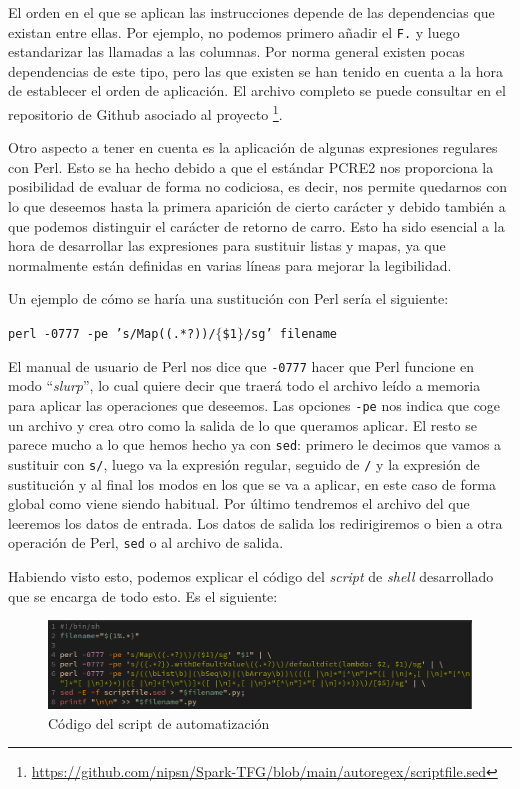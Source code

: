 \documentclass[12pt,twoside,titlepage]{report}
\newcommand{\quotes}[1]{``#1''}
\begin{document}
El orden en el que se aplican las instrucciones depende de las dependencias que existan entre ellas. Por ejemplo, no podemos primero añadir el \texttt{F.} y luego estandarizar las llamadas a las columnas. Por norma general existen pocas dependencias de este tipo, pero las que existen se han tenido en cuenta a la hora de establecer el orden de aplicación. El archivo completo se puede consultar en el repositorio de Github asociado al proyecto \footnote{\url{https://github.com/nipsn/Spark-TFG/blob/main/autoregex/scriptfile.sed}}.

Otro aspecto a tener en cuenta es la aplicación de algunas expresiones regulares con Perl. Esto se ha hecho debido a que el estándar PCRE2 nos proporciona la posibilidad de evaluar de forma no codiciosa, es decir, nos permite quedarnos con lo que deseemos hasta la primera aparición de cierto carácter y debido también a que podemos distinguir el carácter de retorno de carro. Esto ha sido esencial a la hora de desarrollar las expresiones para sustituir listas y mapas, ya que normalmente están definidas en varias líneas para mejorar la legibilidad.

Un ejemplo de cómo se haría una sustitución con Perl sería el siguiente:

\texttt{perl -0777 -pe 's/Map((.*?))/$\lbrace$\$1$\rbrace$/sg' filename}

El manual de usuario de Perl nos dice que \texttt{-0777} hacer que Perl funcione en modo \quotes{\textit{slurp}}, lo cual quiere decir que traerá todo el archivo leído a memoria para aplicar las operaciones que deseemos. Las opciones \texttt{-pe} nos indica que coge un archivo y crea otro como la salida de lo que queramos aplicar. El resto se parece mucho a lo que hemos hecho ya con \texttt{sed}: primero le decimos que vamos a sustituir con \texttt{s/}, luego va la expresión regular, seguido de \texttt{/} y la expresión de sustitución y al final los modos en los que se va a aplicar, en este caso de forma global como viene siendo habitual. Por último tendremos el archivo del que leeremos los datos de entrada. Los datos de salida los redirigiremos o bien a otra operación de Perl, \texttt{sed} o al archivo de salida.

Habiendo visto esto, podemos explicar el código del \textit{script} de \textit{shell} desarrollado que se encarga de todo esto. Es el siguiente:

\begin{figure}[H]
	\includegraphics[scale=0.3]{autoregexscript.png}
	\centering
	\caption{Código del script de automatización}
	\label{fig:autoregex}
	\centering
\end{figure}
\end{document}
